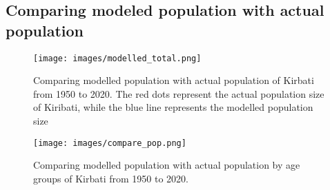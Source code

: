 \subsection{Comparing modeled population with actual population}
\begin{figure}[!ht]
    \texttt{[image: images/modelled\_total.png]}
    \caption{Comparing modelled population with actual population of Kirbati from 1950 to 2020. The red dots represent the actual population size of Kiribati,
     while the blue line represents the modelled population size}
    \label{fig:modelled_total}
\end{figure}

\begin{figure}[!ht]
    \texttt{[image: images/compare\_pop.png]}
    \caption{Comparing modelled population with actual population by age groups of Kirbati from 1950 to 2020.}
    \label{fig:compare_group}
\end{figure}